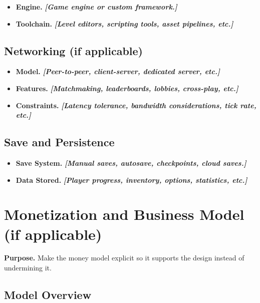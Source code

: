 \documentclass[12pt]{article}
\newcommand{\placeholder}[1]{\textbf{\textit{[#1]}}}
\begin{document}
\begin{itemize}
    \item \textbf{Engine.} \placeholder{Game engine or custom framework.}
    \item \textbf{Toolchain.} \placeholder{Level editors, scripting tools, asset pipelines, etc.}
\end{itemize}

\subsection{Networking (if applicable)}

\begin{itemize}
    \item \textbf{Model.} \placeholder{Peer-to-peer, client-server, dedicated server, etc.}
    \item \textbf{Features.} \placeholder{Matchmaking, leaderboards, lobbies, cross-play, etc.}
    \item \textbf{Constraints.} \placeholder{Latency tolerance, bandwidth considerations, tick rate, etc.}
\end{itemize}

\subsection{Save and Persistence}

\begin{itemize}
    \item \textbf{Save System.} \placeholder{Manual saves, autosave, checkpoints, cloud saves.}
    \item \textbf{Data Stored.} \placeholder{Player progress, inventory, options, statistics, etc.}
\end{itemize}

\section{Monetization and Business Model (if applicable)}

\textbf{Purpose.} Make the money model explicit so it supports the design instead of undermining it.

\subsection{Model Overview}
\end{document}

